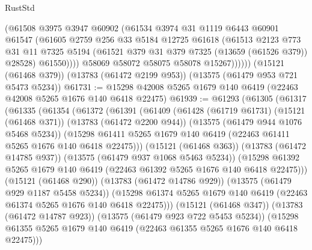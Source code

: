 \begin{lexlean}{RustStd}
\begin{coremodule}
                (@61508
                  @3975
                  @3947
                  @60902
                  (@61534
                    @3974
                    @31
                    @1119
                    @6443
                    @60901
                    @61547
                    (@61605
                      @2759
                      @256
                      @33
                      @5184
                      @12725
                      @61618
                      (@61513
                        @2123
                        @773
                        @31
                        @11
                        @7325
                        @5194
                        (@61521 @379 @31 @379 @7325 (@13659 (@61526 @379)) @28528)
                        @61550))))
                @58069
                @58072
                @58075
                @58078
                @15267))))))
    (@15121 (@61468 @379))
    (@13783 (@61472 @2199 @953))
    (@13575 (@61479 @953 @721 @5473 @5234))
@61731 := @15298 @42008 @5265 @1679 @140 @6419 (@22463 @42008 @5265 @1676 @140 @6418 @22475)
@61939 := @61293
    (@61305
      (@61317
        (@61335
          (@61354
            (@61372
              (@61391
                (@61409
                  (@61428
                    (@61719 @61731)
                    (@15121 (@61468 @371))
                    (@13783 (@61472 @2200 @944))
                    (@13575 (@61479 @944 @1076 @5468 @5234))
                    (@15298
                      @61411
                      @5265
                      @1679
                      @140
                      @6419
                      (@22463 @61411 @5265 @1676 @140 @6418 @22475)))
                  (@15121 (@61468 @363))
                  (@13783 (@61472 @14785 @937))
                  (@13575 (@61479 @937 @1068 @5463 @5234))
                  (@15298
                    @61392
                    @5265
                    @1679
                    @140
                    @6419
                    (@22463 @61392 @5265 @1676 @140 @6418 @22475)))
                (@15121 (@61468 @290))
                (@13783 (@61472 @14786 @929))
                (@13575 (@61479 @929 @1187 @5458 @5234))
                (@15298
                  @61374
                  @5265
                  @1679
                  @140
                  @6419
                  (@22463 @61374 @5265 @1676 @140 @6418 @22475)))
              (@15121 (@61468 @347))
              (@13783 (@61472 @14787 @923))
              (@13575 (@61479 @923 @722 @5453 @5234))
              (@15298 @61355 @5265 @1679 @140 @6419 (@22463 @61355 @5265 @1676 @140 @6418 @22475)))

\end{coremodule}
\end{lexlean}
